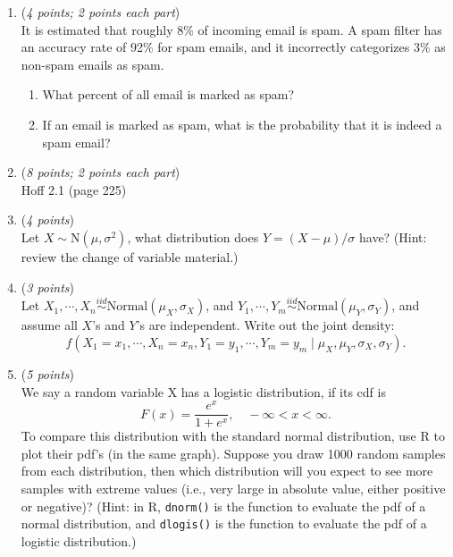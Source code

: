 \documentclass[11pt]{article}
\begin{document}
\begin{enumerate}

    \item ({\it{4 points; 2 points each part}}) \\
    It is estimated that roughly 8\% of incoming email is spam. A spam filter has an accuracy rate of 92\% for spam emails, and it incorrectly categorizes 3\% as non-spam emails as spam.

\begin{enumerate}

\item  What percent of all email is marked as spam?

\item If an email is marked as spam, what is the probability that it is indeed a spam email?

\end{enumerate}
\vspace{2mm}
    \item
    ({\it{8 points; 2 points each part}}) \\
    Hoff 2.1 (page 225)
\vspace{2mm}

    \item 
    ({\it{4 points}}) \\
    Let $X \sim \text{N}(\mu, \sigma^2)$, what distribution does $Y = (X-\mu)/\sigma$ have? (Hint: review the change of variable material.)
    

    \item 
    ({\it{3 points}}) \\
    Let $X_1, \cdots, X_n \overset{iid}{\sim} \textrm{Normal}(\mu_X, \sigma_X)$, and $Y_1, \cdots, Y_m \overset{iid}{\sim} \textrm{Normal}(\mu_Y, \sigma_Y)$, and assume all $X$'s and $Y$'s are independent. Write out the joint density:
    $$
    f(X_1 = x_1, \cdots, X_n = x_n, Y_1 = y_1, \cdots, Y_m = y_m \mid \mu_X, \mu_Y, \sigma_X, \sigma_Y).
    $$
    
    \item ({\it{5 points}})\\
    We say a random variable X has a logistic distribution, if its cdf is
    \[
    F(x) = \frac{e^x}{1 + e^x}, \quad -\infty < x < \infty.
    \]
    To compare this distribution with the standard normal distribution, use R to plot their pdf's (in the same graph).
    Suppose you draw 1000 random samples from each distribution,
    then which distribution will you expect to see more samples with
    extreme values (i.e., very large in absolute value, either positive or negative)? (Hint: in R, \texttt{dnorm()} is the function to evaluate the pdf of a normal distribution, and \texttt{dlogis()} is the function to evaluate the pdf of a logistic distribution.)



\end{enumerate}
\end{document}
